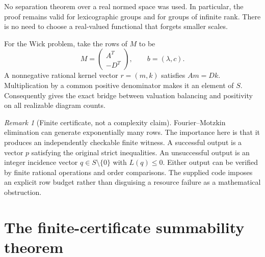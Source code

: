 \documentclass[11pt,letterpaper]{article}
\numberwithin{equation}{section}
\theoremstyle{definition}
\theoremstyle{remark}
\newtheorem{remark}[theorem]{Remark}
\begin{document}
No separation theorem over a real normed space was used. In particular, the
proof remains valid for lexicographic groups and for groups of infinite rank.
There is no need to choose a real-valued functional that forgets smaller
scales.

For the Wick problem, take the rows of $M$ to be
\begin{equation}
 M=\begin{pmatrix}A^T\\-D^T\end{pmatrix},\qquad
 b=(\lambda,c).
 \label{wick:eq:wickM}
\end{equation}
A nonnegative rational kernel vector $r=(m,k)$ satisfies $Am=Dk$.
Multiplication by a common positive denominator makes it an element of $S$.
Consequently  gives the exact bridge between valuation
balancing and positivity on all realizable diagram counts.

\begin{remark}[Finite certificate, not a complexity claim]
Fourier--Motzkin elimination can generate exponentially many rows. The
importance here is that it produces an independently checkable finite
witness. A successful output is a vector $p$ satisfying the original strict
inequalities. An unsuccessful output is an integer incidence vector
$q\in S\setminus\{0\}$ with $L(q)\le0$. Either output can be verified by
finite rational operations and order comparisons. The supplied code imposes
an explicit row budget rather than disguising a resource failure as a
mathematical obstruction.
\end{remark}

\section{The finite-certificate summability theorem}
\label{wick:sec:main}
\end{document}
